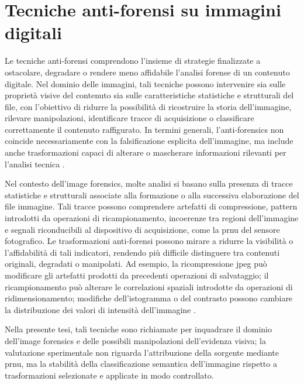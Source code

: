 \section{Tecniche anti-forensi su immagini digitali}
\label{sec:background_antiforensics_images}
Le tecniche anti-forensi comprendono l'insieme di strategie finalizzate a ostacolare, degradare o rendere meno affidabile l'analisi forense di un contenuto digitale. Nel dominio delle immagini, tali tecniche possono intervenire sia sulle proprietà visive del contenuto sia sulle caratteristiche statistiche e strutturali del file, con l'obiettivo di ridurre la possibilità di ricostruire la storia dell'immagine, rilevare manipolazioni, identificare tracce di acquisizione o classificare correttamente il contenuto raffigurato. In termini generali, l'anti-forensics non coincide necessariamente con la falsificazione esplicita dell'immagine, ma include anche trasformazioni capaci di alterare o mascherare informazioni rilevanti per l'analisi tecnica \cite{stamm2010anti,yaacoub2021digital}.

Nel contesto dell'image forensics, molte analisi si basano sulla presenza di tracce statistiche e strutturali associate alla formazione o alla successiva elaborazione del file immagine. Tali tracce possono comprendere artefatti di compressione, pattern introdotti da operazioni di ricampionamento, incoerenze tra regioni dell'immagine e segnali riconducibili al dispositivo di acquisizione, come la \gls{prnu} del sensore fotografico. Le trasformazioni anti-forensi possono mirare a ridurre la visibilità o l'affidabilità di tali indicatori, rendendo più difficile distinguere tra contenuti originali, degradati o manipolati. Ad esempio, la ricompressione \gls{jpeg} può modificare gli artefatti prodotti da precedenti operazioni di salvataggio; il ricampionamento può alterare le correlazioni spaziali introdotte da operazioni di ridimensionamento; modifiche dell'istogramma o del contrasto possono cambiare la distribuzione dei valori di intensità dell'immagine \cite{popescu2005exposing,farid2016photo,lukas2006prnu}.

Nella presente tesi, tali tecniche sono richiamate per inquadrare il dominio dell'image forensics e delle possibili manipolazioni dell'evidenza visiva; la valutazione sperimentale non riguarda l'attribuzione della sorgente mediante \gls{prnu}, ma la stabilità della classificazione semantica dell'immagine rispetto a trasformazioni selezionate e applicate in modo controllato.

